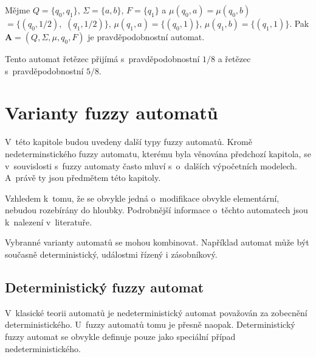 \begin{example}
 Mějme $Q = \{ q_0, q_1 \}$, $\Sigma = \{ a, b \}$, $F = \{ q_1 \}$ a $\mu(q_0, a) = \mu(q_0, b)$ $= \{ (q_0, 1/2),$ $(q_1, 1/2) \}$, $\mu(q_1, a) = \{ (q_0, 1) \}$, $\mu(q_1, b) = \{ (q_1, 1) \}$. Pak $\mathbf{A} = (Q, \Sigma, \mu, q_0, F)$ je pravděpodobnostní automat.
 
 Tento automat řetězec  přijímá s~pravděpodobnostní $1/8$ a řetězec  s~pravděpodobnostní $5/8$.
\end{example}



\section{Varianty fuzzy automatů}
V~této kapitole budou uvedeny další typy fuzzy automatů. Kromě nedeterminstického fuzzy automatu, kterému byla věnována předchozí kapitola, se v~souvislosti s~fuzzy automaty často mluví s~o~dalších výpočetních modelech. A~právě ty jsou předmětem této kapitoly. 

Vzhledem k~tomu, že se obvykle jedná o~modifikace obvykle elementární, nebudou rozebírány do hloubky. Podrobnější informace o~těchto automatech jsou k~nalezení v~literatuře.

\begin{note}
 Vybranné varianty automatů se mohou kombinovat. Například automat může být současně deterministický, událostmi řízený i zásobníkový.
\end{note}

\subsection{Deterministický fuzzy automat}

V~klasické teorii automatů je nedeterministický automat považován za zobecnění deterministického. U~fuzzy automatů tomu je přesně naopak. Deterministický fuzzy automat se obvykle definuje pouze jako speciální případ nedeterministického.

